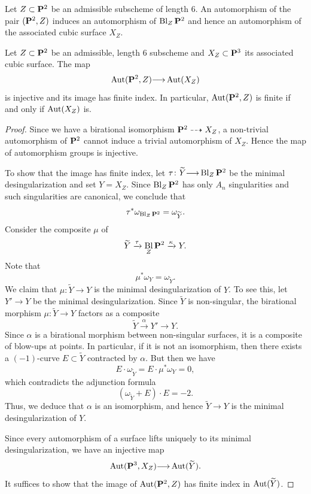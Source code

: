 \documentclass[11pt,reqno, letterpaper]{amsart}
\DeclareMathOperator{\Bl}{Bl}
\renewcommand{\to}{{\longrightarrow}}
\numberwithin{equation}{section}
\begin{document}
Let $Z \subset \P^2$ be an admissible subscheme of length 6.
An automorphism of the pair $(\P^2, Z)$ induces an automorphism of $\Bl_Z\P^2$ and hence an automorphism of the associated cubic surface $X_Z$.

\begin{proposition}
  \label{prop:good} Let $Z \subset \P^2$ be an admissible, length $6$
  subscheme and $X_Z \subset \P^3$ its associated cubic surface.
  The map
  \[ \Aut(\P^2, Z) \to \Aut(X_Z)\]
  is injective and its image has finite index.
  In particular, $\Aut(\P^2, Z)$ is finite if and only if $\Aut(X_Z)$ is.
\end{proposition}

\begin{proof}
  Since we have a birational isomorphism $\P^2 \dashrightarrow X_Z$, a non-trivial automorphism of $\P^2$ cannot induce a trivial automorphism of $X_Z$.
  Hence the map of automorphism groups is injective.

  To show that the image has finite index, let $\tau \colon \widetilde Y \to \Bl_Z\P^2$ be the minimal desingularization and set $Y = X_Z$.
  Since $\Bl_Z\P^2$ has only $A_n$ singularities and such singularities are canonical, we conclude that
  \[\tau^* \omega_{\Bl_Z\P^2} = \omega_{\widetilde Y}.\]
  Consider the composite $\mu$ of 
  \[ \widetilde Y \xrightarrow{\tau} \Bl_Z \P^2 \xrightarrow{\kappa} Y.\]
  Note that
  \[ \mu^* \omega_Y = \omega_{\widetilde Y}.\]
  We claim that $\mu \colon \widetilde Y \to Y$ is the minimal desingularization of $Y$.
  To see this, let $Y' \to Y$ be the minimal desingularization.
  Since $\widetilde Y$ is non-singular, the birational morphism $\mu \colon \widetilde Y \to Y$ factors as a composite
  \[ \widetilde Y \xrightarrow{\alpha} Y' \to Y.\]
  Since $\alpha$ is a birational morphism between non-singular surfaces, it is a composite of blow-ups at points.
  In particular, if it is not an isomorphism, then there exists a $(-1)$-curve $E \subset \widetilde Y$ contracted by $\alpha$.
  But then we have 
  \[ E \cdot \omega_{\widetilde Y} = E \cdot \mu^* \omega_Y = 0,\]
  which contradicts the adjunction formula
  \[ \left(\omega_{\widetilde Y}+ E\right) \cdot E = -2.\]
  Thus, we deduce that $\alpha$ is an isomorphism, and hence $\widetilde Y \to Y$ is the minimal desingularization of $Y$.
  
  Since every automorphism of a surface lifts uniquely to its minimal
  desingularization, we have an injective map
  \[ \Aut(\P^3, X_Z) \to \Aut(\widetilde Y).\]
  It suffices to show that the image of $\Aut(\P^2, Z)$ has finite index in $\Aut(\widetilde Y)$.


\end{proof}
\end{document}
